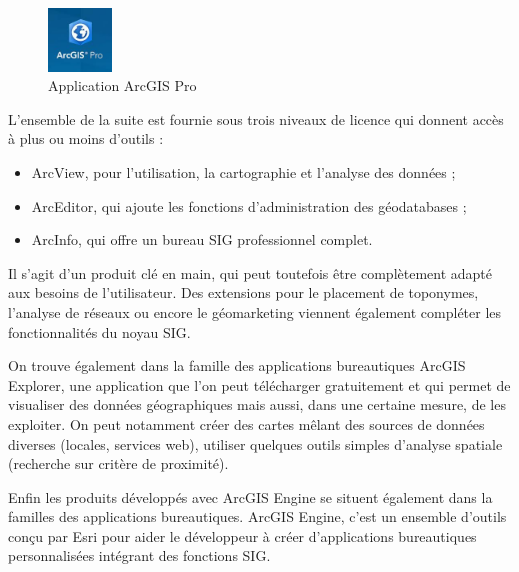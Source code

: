 \documentclass[11pt]{article}
\begin{document}
\begin{figure}[!h]
	\center \includegraphics[width=0.15\textwidth]{img/cours/arcgis_pro.jpg}
	\caption{Application ArcGIS Pro}
\end{figure}

L'ensemble de la suite est fournie sous trois niveaux de licence qui donnent accès à plus ou moins d’outils :
\begin{itemize}
	\item ArcView, pour l’utilisation, la cartographie et l’analyse des données ; 
	\item ArcEditor, qui ajoute les fonctions d’administration des géodatabases ;
	\item ArcInfo, qui offre un bureau SIG professionnel complet.
\end{itemize} 

Il s’agit d’un produit clé en main, qui peut toutefois être complètement adapté aux besoins de l’utilisateur. Des extensions pour le placement de toponymes, l’analyse de réseaux ou encore le géomarketing viennent également compléter les fonctionnalités du noyau SIG.

\begin{center}
\end{center}

On trouve également dans la famille des applications bureautiques ArcGIS Explorer, une application que l'on peut télécharger gratuitement et qui permet de visualiser des données géographiques mais aussi, dans une certaine mesure, de les exploiter. On peut notamment créer des cartes mêlant des sources de données diverses (locales, services web), utiliser quelques outils simples d’analyse spatiale (recherche sur critère de proximité).

Enfin les produits développés avec ArcGIS Engine se situent également dans la familles des applications bureautiques. ArcGIS Engine, c'est un ensemble d'outils conçu par Esri pour aider le développeur à créer d’applications bureautiques personnalisées intégrant des fonctions SIG.
\end{document}
